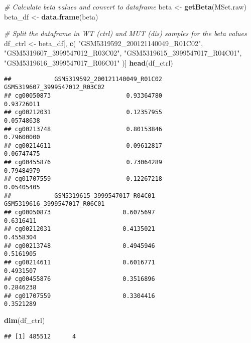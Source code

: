 \documentclass[
]{article}
\newenvironment{Shaded}{\begin{snugshade}}{\end{snugshade}}
\newcommand{\CommentTok}[1]{\textcolor[rgb]{0.56,0.35,0.01}{\textit{#1}}}
\newcommand{\FunctionTok}[1]{\textcolor[rgb]{0.13,0.29,0.53}{\textbf{#1}}}
\newcommand{\NormalTok}[1]{#1}
\newcommand{\OtherTok}[1]{\textcolor[rgb]{0.56,0.35,0.01}{#1}}
\newcommand{\StringTok}[1]{\textcolor[rgb]{0.31,0.60,0.02}{#1}}
\begin{document}
\begin{Shaded}
\begin{Highlighting}[]
\CommentTok{\# Calculate beta values and convert to dataframe}
\NormalTok{beta }\OtherTok{\textless{}{-}} \FunctionTok{getBeta}\NormalTok{(MSet.raw)}
\NormalTok{beta\_df }\OtherTok{\textless{}{-}} \FunctionTok{data.frame}\NormalTok{(beta)}

\CommentTok{\# Split the dataframe in WT (ctrl) and MUT (dis) samples for the beta values}
\NormalTok{df\_ctrl }\OtherTok{\textless{}{-}}\NormalTok{ beta\_df[, }\FunctionTok{c}\NormalTok{(}
  \StringTok{"GSM5319592\_200121140049\_R01C02"}\NormalTok{,}
  \StringTok{"GSM5319607\_3999547012\_R03C02"}\NormalTok{,}
  \StringTok{"GSM5319615\_3999547017\_R04C01"}\NormalTok{,}
  \StringTok{"GSM5319616\_3999547017\_R06C01"}
\NormalTok{)]}
\FunctionTok{head}\NormalTok{(df\_ctrl)}
\end{Highlighting}
\end{Shaded}

\begin{verbatim}
##            GSM5319592_200121140049_R01C02 GSM5319607_3999547012_R03C02
## cg00050873                     0.93364780                   0.93726011
## cg00212031                     0.12357955                   0.05748638
## cg00213748                     0.80153846                   0.79600000
## cg00214611                     0.09612817                   0.06747475
## cg00455876                     0.73064289                   0.79484979
## cg01707559                     0.12267218                   0.05405405
##            GSM5319615_3999547017_R04C01 GSM5319616_3999547017_R06C01
## cg00050873                    0.6075697                    0.6316411
## cg00212031                    0.4135021                    0.4558304
## cg00213748                    0.4945946                    0.5161905
## cg00214611                    0.6016771                    0.4931507
## cg00455876                    0.3516896                    0.2846238
## cg01707559                    0.3304416                    0.3521289
\end{verbatim}

\begin{Shaded}
\begin{Highlighting}[]
\FunctionTok{dim}\NormalTok{(df\_ctrl)}
\end{Highlighting}
\end{Shaded}

\begin{verbatim}
## [1] 485512      4
\end{verbatim}
\end{document}

